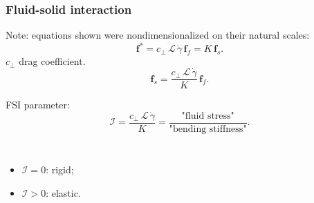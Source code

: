 \documentclass{beamer}
\newcommand{\bi}{\begin{itemize}}
\newcommand{\ei}{\end{itemize}}
\begin{document}
\begin{frame}
	\frametitle{Fluid-solid interaction}
	\begin{overlayarea}{\textwidth}{\textheight}
	\small Note: equations shown were nondimensionalized on their natural scales:
	\begin{equation*}
		\label{eqn:102}
		\mathbf{f}^*=c_\perp\,\mathcal{L}\,\dot{\gamma}\,\mathbf{f}_{f}=K\,\mathbf{f}_{s}.
	\end{equation*}
	$c_\perp$ drag coefficient. 
	\begin{equation*}
		\textbf{f}_{s}=\frac{c_\perp\,\mathcal{L}\,\dot{\gamma}}{K}\,\textbf{f}_{f}.
	\end{equation*}

	FSI parameter: 
	\begin{equation*}
		\label{eqn:38}
		\mathcal{I}=\frac{c_\perp\,\mathcal{L}\,\dot{\gamma}}{K}=\frac{\text{"fluid stress"}}{\text{"bending stiffness"}}.
	\end{equation*}
		\begin{columns}
			  \small \bi
			 \item $\mathcal{I}=0$: rigid;
			 \item $\mathcal{I}>0$: elastic.
			 \ei
			 \vspace{-0.8cm}	
		\end{columns}
	\end{overlayarea}
\end{frame}



\end{document}
